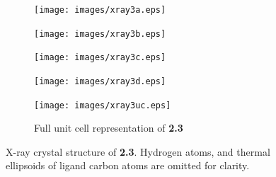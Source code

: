 \begin{figure}[!ht]
 \centering
 \begin{subfigure}[b]{0.49\textwidth}
  \texttt{[image: images/xray3a.eps]}
 \end{subfigure}
 \begin{subfigure}[b]{0.49\textwidth}
  \texttt{[image: images/xray3b.eps]}
 \end{subfigure}
 \begin{subfigure}[b]{0.49\textwidth}
  \texttt{[image: images/xray3c.eps]}
 \end{subfigure}
 \begin{subfigure}[b]{0.49\textwidth}
  \texttt{[image: images/xray3d.eps]}
 \end{subfigure}
 \begin{subfigure}[b]{\textwidth}
  \centering
  \texttt{[image: images/xray3uc.eps]}
  \caption{Full unit cell representation of \textbf{2.3}}
 \end{subfigure}
\caption[X-ray crystal structure of \textbf{2.3}]{X-ray crystal structure of \textbf{2.3}. Hydrogen atoms, and thermal ellipsoids of ligand carbon atoms are omitted for clarity.}
\label{fig.xray23}
\end{figure}

